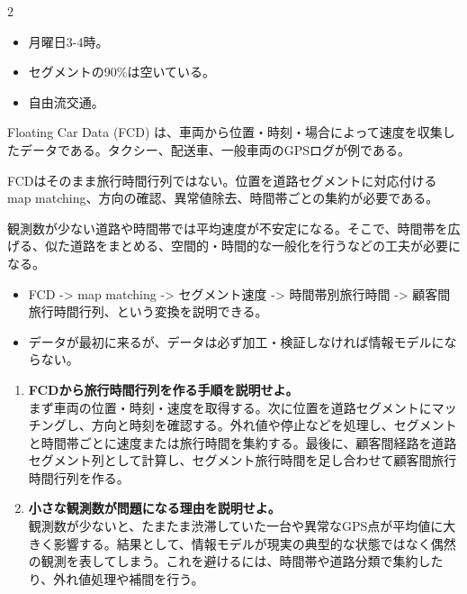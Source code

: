 \clearpage
{}
\begin{multicols}{2}\footnotesize\raggedcolumns
{}
\begin{itemize}
\item 月曜日3-4時。
\item セグメントの90\%は空いている。
\item 自由流交通。
\end{itemize}
Floating Car Data (FCD) は、車両から位置・時刻・場合によって速度を収集したデータである。タクシー、配送車、一般車両のGPSログが例である。\par

FCDはそのまま旅行時間行列ではない。位置を道路セグメントに対応付ける map matching、方向の確認、異常値除去、時間帯ごとの集約が必要である。\par

観測数が少ない道路や時間帯では平均速度が不安定になる。そこで、時間帯を広げる、似た道路をまとめる、空間的・時間的な一般化を行うなどの工夫が必要になる。\par
{}
\begin{itemize}
\item FCD -> map matching -> セグメント速度 -> 時間帯別旅行時間 -> 顧客間旅行時間行列、という変換を説明できる。
\item データが最初に来るが、データは必ず加工・検証しなければ情報モデルにならない。
\end{itemize}
\begin{enumerate}
\item \textbf{FCDから旅行時間行列を作る手順を説明せよ。}\\まず車両の位置・時刻・速度を取得する。次に位置を道路セグメントにマッチングし、方向と時刻を確認する。外れ値や停止などを処理し、セグメントと時間帯ごとに速度または旅行時間を集約する。最後に、顧客間経路を道路セグメント列として計算し、セグメント旅行時間を足し合わせて顧客間旅行時間行列を作る。
\item \textbf{小さな観測数が問題になる理由を説明せよ。}\\観測数が少ないと、たまたま渋滞していた一台や異常なGPS点が平均値に大きく影響する。結果として、情報モデルが現実の典型的な状態ではなく偶然の観測を表してしまう。これを避けるには、時間帯や道路分類で集約したり、外れ値処理や補間を行う。
\end{enumerate}
\end{multicols}

